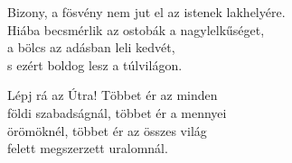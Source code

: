 \newpage
\begin{dhpverse}

 Bizony, a fösvény nem jut el az istenek lakhelyére.\\
Hiába becsmérlik az ostobák a nagylelkűséget,\\
a bölcs az adásban leli kedvét,\\
s ezért boldog lesz a túlvilágon.

 Lépj rá az Útra! Többet ér az minden\\
földi szabadságnál, többet ér a mennyei\\
örömöknél, többet ér az összes világ\\
felett megszerzett uralomnál.

\end{dhpverse}
